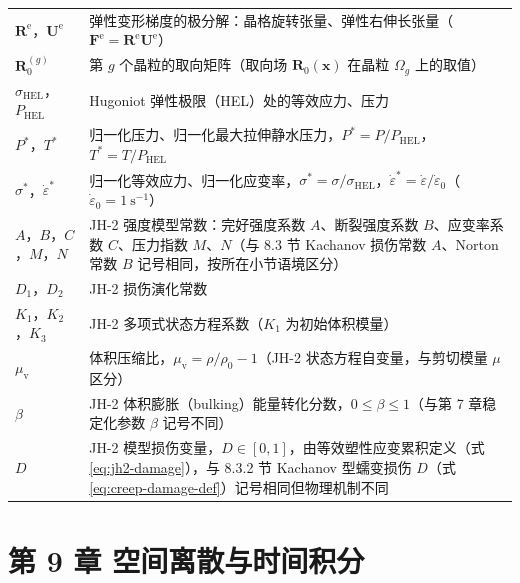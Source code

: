 \begin{longtable}{@{}p{4.8cm}>{\raggedright\arraybackslash}p{10.2cm}@{}}
  $\mathbf{R}^{\mathrm{e}}$，$\mathbf{U}^{\mathrm{e}}$ & 弹性变形梯度的极分解：晶格旋转张量、弹性右伸长张量（$\mathbf{F}^{\mathrm{e}}=\mathbf{R}^{\mathrm{e}}\mathbf{U}^{\mathrm{e}}$） \\
  $\mathbf{R}_{0}^{(g)}$ & 第 $g$ 个晶粒的取向矩阵（取向场 $\mathbf{R}_{0}(\mathbf{x})$ 在晶粒 $\Omega_{g}$ 上的取值） \\
  $\sigma_{\mathrm{HEL}}$，$P_{\mathrm{HEL}}$ & Hugoniot 弹性极限（HEL）处的等效应力、压力 \\
  $P^{*}$，$T^{*}$ & 归一化压力、归一化最大拉伸静水压力，$P^{*}=P/P_{\mathrm{HEL}}$，$T^{*}=T/P_{\mathrm{HEL}}$ \\
  $\sigma^{*}$，$\dot{\varepsilon}^{*}$ & 归一化等效应力、归一化应变率，$\sigma^{*}=\sigma/\sigma_{\mathrm{HEL}}$，$\dot{\varepsilon}^{*}=\dot{\varepsilon}/\dot{\varepsilon}_{0}$（$\dot{\varepsilon}_{0}=1~\mathrm{s}^{-1}$） \\
  $A$，$B$，$C$，$M$，$N$ & JH-2 强度模型常数：完好强度系数 $A$、断裂强度系数 $B$、应变率系数 $C$、压力指数 $M$、$N$（与 8.3 节 Kachanov 损伤常数 $A$、Norton 常数 $B$ 记号相同，按所在小节语境区分） \\
  $D_{1}$，$D_{2}$ & JH-2 损伤演化常数 \\
  $K_{1}$，$K_{2}$，$K_{3}$ & JH-2 多项式状态方程系数（$K_{1}$ 为初始体积模量） \\
  $\mu_{\mathrm{v}}$ & 体积压缩比，$\mu_{\mathrm{v}}=\rho/\rho_{0}-1$（JH-2 状态方程自变量，与剪切模量 $\mu$ 区分） \\
  $\beta$ & JH-2 体积膨胀（bulking）能量转化分数，$0\le\beta\le1$（与第 7 章稳定化参数 $\beta$ 记号不同） \\
  $D$ & JH-2 模型损伤变量，$D\in[0,1]$，由等效塑性应变累积定义（式\eqref{eq:jh2-damage}），与 8.3.2 节 Kachanov 型蠕变损伤 $D$（式\eqref{eq:creep-damage-def}）记号相同但物理机制不同 \\
\end{longtable}

\section*{第 9 章 空间离散与时间积分}

